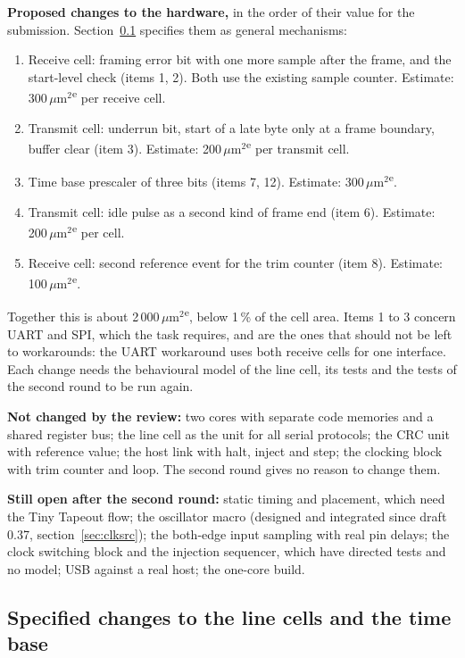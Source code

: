 \documentclass[10pt,a4paper]{article}
\newcommand{\est}{\textsuperscript{e}}
\begin{document}
\textbf{Proposed changes to the hardware,} in the order of their value for the submission. Section~\ref{sec:lcext} specifies them as general mechanisms:

\begin{enumerate}
\item Receive cell: framing error bit with one more sample after the frame, and the start-level check (items 1, 2).
Both use the existing sample counter. Estimate: 300\,$\mu$m$^2$\est{} per receive cell.
\item Transmit cell: underrun bit, start of a late byte only at a frame boundary, buffer clear (item 3). Estimate:
200\,$\mu$m$^2$\est{} per transmit cell.
\item Time base prescaler of three bits (items 7, 12). Estimate: 300\,$\mu$m$^2$\est.
\item Transmit cell: idle pulse as a second kind of frame end (item 6). Estimate: 200\,$\mu$m$^2$\est{} per cell.
\item Receive cell: second reference event for the trim counter (item 8). Estimate: 100\,$\mu$m$^2$\est.
\end{enumerate}

Together this is about 2\,000\,$\mu$m$^2$\est, below 1\,\% of the cell area. Items 1 to 3 concern UART and SPI, which
the task requires, and are the ones that should not be left to workarounds: the UART workaround uses both
receive cells for one interface. Each change needs the behavioural model of the line cell, its tests and the
tests of the second round to be run again.

\textbf{Not changed by the review:} two cores with separate code memories and a shared register bus; the line
cell as the unit for all serial protocols; the CRC unit with reference value; the host link with halt,
inject and step; the clocking block with trim counter and loop. The second round gives no reason to change them.

\textbf{Still open after the second round:} static timing and placement, which need the Tiny Tapeout flow; the
oscillator macro (designed and integrated since draft 0.37, section~\ref{sec:clksrc}); the both-edge input sampling with real pin delays; the clock switching block and the
injection sequencer, which have directed tests and no model; USB against a real host; the one-core build.

\subsection{Specified changes to the line cells and the time base}\label{sec:lcext}
\end{document}
